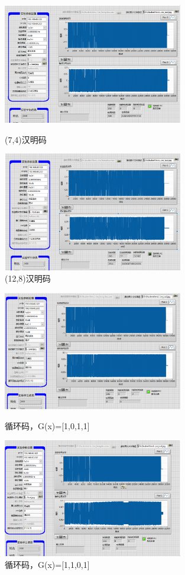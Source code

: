 \documentclass[UTF8]{ctexart}
\begin{document}
\begin{figure}[H]
    \centering
    \includegraphics[width=0.7\textwidth]{pics/74Hcrc8_pics.png}
    \caption{(7,4)汉明码}
    \includegraphics[width=0.7\textwidth]{pics/(12,8).png}
    \caption{(12,8)汉明码}

\end{figure}

\begin{figure}[H]
    \centering
    \includegraphics[width=0.7\textwidth]{pics/1011.png}
    \caption{循环码，G(x)=[1,0,1,1]}
    \includegraphics[width=0.7\textwidth]{pics/1101.png}
    \caption{循环码，G(x)=[1,1,0,1]}
\end{figure}
\end{document}
